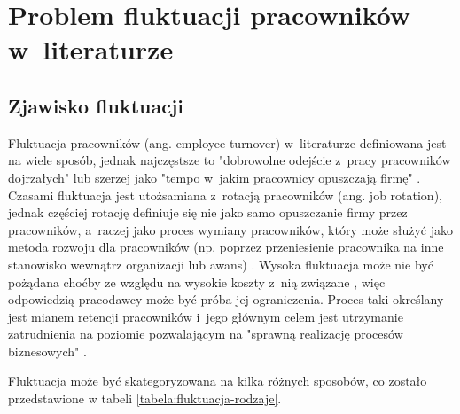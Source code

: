 

\chapter{Problem fluktuacji pracowników w~literaturze}\label{ch:knowladge-state}


\section{Zjawisko fluktuacji}\label{sec:zjawisko-fluktuacji}
Fluktuacja pracowników (ang. employee turnover) w~literaturze definiowana jest na wiele sposób, jednak najczęstsze to "dobrowolne odejście z~pracy pracowników dojrzałych" \cite{wozniak-2016}
lub szerzej jako "tempo w~jakim pracownicy opuszczają firmę" \cite{cron-2006}.
Czasami fluktuacja jest utożsamiana z~rotacją pracowników (ang. job rotation),
jednak częściej rotację definiuje się nie jako samo opuszczanie firmy przez pracowników, a~raczej jako proces wymiany pracowników,
który może służyć jako metoda rozwoju dla pracowników (np. poprzez przeniesienie pracownika na inne stanowisko wewnątrz organizacji lub awans) \cite{pocztowski-2009}.
Wysoka fluktuacja może nie być pożądana choćby ze względu na wysokie koszty z~nią związane \cite{philips-edwards-2009},
więc odpowiedzią pracodawcy może być próba jej ograniczenia.
Proces taki określany jest mianem retencji pracowników i~jego głównym celem jest utrzymanie zatrudnienia na poziomie pozwalającym na "sprawną realizację procesów biznesowych" \cite{pocztowski-2007}.

Fluktuacja może być skategoryzowana na kilka różnych sposobów, co zostało przedstawione w tabeli \ref{tabela:fluktuacja-rodzaje}.

